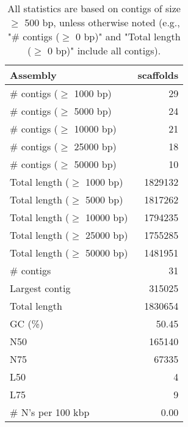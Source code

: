 \documentclass[12pt,a4paper]{article}
\begin{document}
\begin{table}[ht]
\begin{center}
\caption{All statistics are based on contigs of size $\geq$ 500 bp, unless otherwise noted (e.g., "\# contigs ($\geq$ 0 bp)" and "Total length ($\geq$ 0 bp)" include all contigs).}
\begin{tabular}{|l*{1}{|r}|}
\hline
Assembly & scaffolds \\ \hline
\# contigs ($\geq$ 1000 bp) & 29 \\ \hline
\# contigs ($\geq$ 5000 bp) & 24 \\ \hline
\# contigs ($\geq$ 10000 bp) & 21 \\ \hline
\# contigs ($\geq$ 25000 bp) & 18 \\ \hline
\# contigs ($\geq$ 50000 bp) & 10 \\ \hline
Total length ($\geq$ 1000 bp) & 1829132 \\ \hline
Total length ($\geq$ 5000 bp) & 1817262 \\ \hline
Total length ($\geq$ 10000 bp) & 1794235 \\ \hline
Total length ($\geq$ 25000 bp) & 1755285 \\ \hline
Total length ($\geq$ 50000 bp) & 1481951 \\ \hline
\# contigs & 31 \\ \hline
Largest contig & 315025 \\ \hline
Total length & 1830654 \\ \hline
GC (\%) & 50.45 \\ \hline
N50 & 165140 \\ \hline
N75 & 67335 \\ \hline
L50 & 4 \\ \hline
L75 & 9 \\ \hline
\# N's per 100 kbp & 0.00 \\ \hline
\end{tabular}
\end{center}
\end{table}
\end{document}
